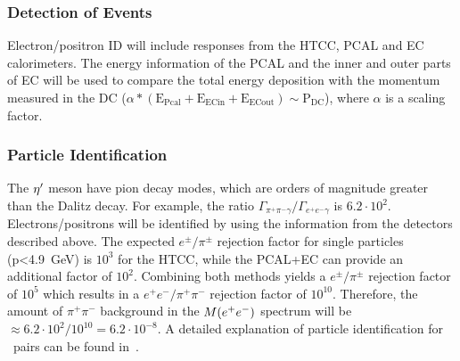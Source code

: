\subsubsection{Detection of \epemT Events} 
Electron/positron ID will include responses from the HTCC, PCAL and EC calorimeters. The energy information of the PCAL and the inner and outer parts of EC will be used to compare the total energy deposition with the momentum measured in the DC ($\alpha*(\mathrm{E_{Pcal}} + \mathrm{E_{ECin}}+ \mathrm{E_{ECout}}) \sim \mathrm{P_{DC}}$), where $\alpha$ is a scaling factor.
\subsubsection{Particle Identification}
The $\eta^{\prime}$ meson have pion decay modes, which are orders of magnitude greater than the Dalitz decay. For example, the ratio $\Gamma_{\pi^+\pi^-\gamma} / \Gamma_{e^+e^- \gamma} $ is $ 6.2\cdot 10^2$. 
Electrons/positrons will be identified by using the information from the detectors described above. The expected $e^\pm/\pi^\pm$ rejection factor for single particles (p<4.9~GeV) is $10^3$ for the HTCC, while the PCAL+EC can provide an additional factor of $10^2$. Combining both methods yields a $e^\pm/\pi^\pm$ rejection factor of $10^5$ which results in a $e^+e^-/\pi^+\pi^-$ rejection factor of $10^{10}$. Therefore, the amount of $\pi^+\pi^-$ background in the $M(e^+e^-)$ spectrum will be $\approx 6.2\cdot 10^2/10^{10} = 6.2\cdot10^{-8}$. A detailed explanation of particle identification for \epemT \ pairs can be found in~\cite{clas.proposal.jpsi}.
